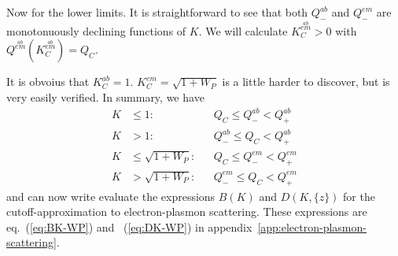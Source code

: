 \documentclass[physics,phd,nolot,nolof]{uccthesis}%
\begin{document}
{Now for the lower limits. 
It is straightforward to see that both $Q^{ab}_-$ and $Q^{em}_-$ are 
monotonuously declining functions of $K$.
We will calculate $K_C^{\stackrel{ab}{em}}>0$ with 
$Q^{\stackrel{ab}{em}}(K_C^{\stackrel{ab}{em}}) =Q_C$.

It is obvoius that $K_C^{ab} =1$.
$K_C^{em} = \sqrt{1+W_P}$ is a little harder to discover, but is very easily verified.
In summary, we have 
\begin{equation}
  \begin{aligned}
    K&\leq 1: 		&& Q_C\leq Q^{ab}_- < Q^{ab}_+\\
    K& >   1: 		&& Q^{ab}_-\leq Q_C < Q^{ab}_+\\
    K&\leq\sqrt{1+W_P}:	&& Q_C\leq Q^{em}_- < Q^{em}_+\\
    K& >\sqrt{1+W_P}: 	&& Q^{em}_-\leq Q_C < Q^{em}_+
  \end{aligned}
  \label{eq:plasmon-cutoff-limits}
\end{equation}
and can now write evaluate the expressions $B(K)$ and $D(K,\{z\})$ for the cutoff-approximation to electron-plasmon scattering.
These expressions are eq.~(\ref{eq:BK-WP}) and ~(\ref{eq:DK-WP}) in appendix~\ref{app:electron-plasmon-scattering}.
\appendix
\begin{landscape}

\end{landscape}}
\end{document}
